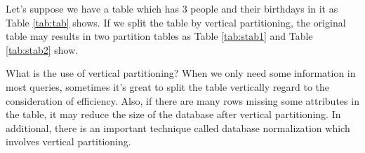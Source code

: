 \documentclass[12pt, a4paper]{article}
\begin{document}
Let's suppose we have a table which has 3 people and their birthdays in it as Table \ref{tab:tab} shows. If we split the table by vertical partitioning, the original table may results in two partition tables as Table \ref{tab:stab1} and Table \ref{tab:stab2} show.


What is the use of vertical partitioning? When we only need some information in most queries, sometimes it's great to split the table vertically regard to the consideration of efficiency. Also, if there are many rows missing some attributes in the table, it may reduce the size of the database after vertical partitioning. In additional, there is an important technique called database normalization which involves vertical partitioning.

\end{document}
